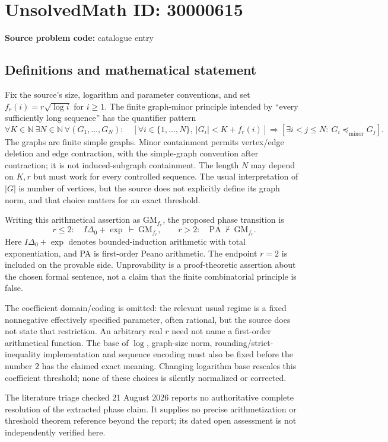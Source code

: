 \documentclass[11pt]{article}
\newcommand{\N}{\mathbb{N}}
\begin{document}
\section*{UnsolvedMath ID: 30000615}
\textbf{Source problem code:} catalogue entry
\subsection{Definitions and mathematical statement}
Fix the source's size, logarithm and parameter conventions, and set $f_r(i)=r\sqrt{\log i}$ for $i\geq1$. The finite graph-minor principle intended by ``every sufficiently long sequence'' has the quantifier pattern
\[
 \forall K\in\N\ \exists N\in\N\ \forall(G_1,\ldots,G_N):\quad
 \left[\forall i\in\{1,\ldots,N\},\ |G_i|<K+f_r(i)\right]
 \Longrightarrow
 \left[\exists i<j\leq N:\ G_i\preccurlyeq_{\mathrm{minor}}G_j\right].
\]
The graphs are finite simple graphs. Minor containment permits vertex/edge deletion and edge contraction, with the simple-graph convention after contraction; it is not induced-subgraph containment. The length $N$ may depend on $K,r$ but must work for every controlled sequence. The usual interpretation of $|G|$ is number of vertices, but the source does not explicitly define its graph norm, and that choice matters for an exact threshold.

Writing this arithmetical assertion as $\mathrm{GM}_{f_r}$, the proposed phase transition is
\[
 r\leq2:\quad I\Delta_0+\exp\ \vdash\ \mathrm{GM}_{f_r},
 \qquad
 r>2:\quad \mathrm{PA}\ \nvdash\ \mathrm{GM}_{f_r}.
\]
Here $I\Delta_0+\exp$ denotes bounded-induction arithmetic with total exponentiation, and PA is first-order Peano arithmetic. The endpoint $r=2$ is included on the provable side. Unprovability is a proof-theoretic assertion about the chosen formal sentence, not a claim that the finite combinatorial principle is false.

The coefficient domain/coding is omitted: the relevant usual regime is a fixed nonnegative effectively specified parameter, often rational, but the source does not state that restriction. An arbitrary real $r$ need not name a first-order arithmetical function. The base of $\log$, graph-size norm, rounding/strict-inequality implementation and sequence encoding must also be fixed before the number $2$ has the claimed exact meaning. Changing logarithm base rescales this coefficient threshold; none of these choices is silently normalized or corrected.

The literature triage checked 21 August 2026 reports no authoritative complete resolution of the extracted phase claim. It supplies no precise arithmetization or threshold theorem reference beyond the report; its dated open assessment is not independently verified here.
\end{document}

